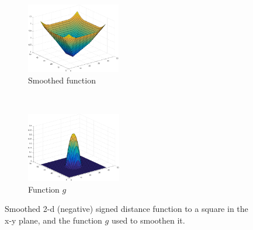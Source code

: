 \begin{figure}[t!]
	\centering
	\begin{subfigure}[t]{0.25\textwidth}
		\includegraphics[height=1.2in]{figures/smoothedSignedDist}
		\caption{Smoothed function}
	\end{subfigure}%
	~
	\begin{subfigure}[t]{0.25\textwidth}
		\includegraphics[height=1.2in]{figures/kernelG}
		\caption{Function $g$}
	\end{subfigure}
	\caption{{\small Smoothed 2-d  (negative) signed distance function to a square in the x-y plane, and the function $g$ used to smoothen it.}}
	\vspace{-10pt}
	\label{fig:smooth2d}
\end{figure}

